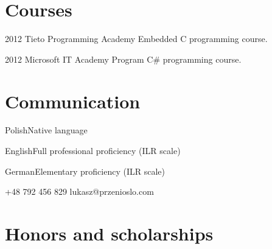 \documentclass{tccv}
\begin{document}
\section{Courses}

\begin{yearlist}

\item{2012}
     {Tieto Programming Academy}
     {Embedded C programming course.}

\item{2012}
     {Microsoft IT Academy Program }
     {C\# programming course.}

\end{yearlist}

\section{Communication}

\begin{factlist}
\item{Polish}{Native language}
\item{English}{Full professional proficiency (ILR scale)}
\item{German}{Elementary proficiency (ILR scale)}
\end{factlist}

    {+48 792 456 829}
    {lukasz@przenioslo.com}
    
\section{Honors and scholarships}
\end{document}
